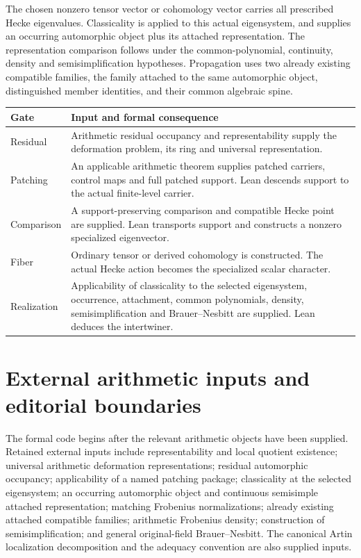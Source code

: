 \documentclass[11pt]{article}
\begin{document}
The chosen nonzero tensor vector or cohomology vector carries all prescribed Hecke eigenvalues. Classicality is applied to this actual eigensystem, and supplies an occurring automorphic object plus its attached representation. The representation comparison follows under the common-polynomial, continuity, density and semisimplification hypotheses. Propagation uses two already existing compatible families, the family attached to the same automorphic object, distinguished member identities, and their common algebraic spine.

\begin{longtable}{p{}p{}}
\toprule Gate & Input and formal consequence\\\midrule\endhead
Residual & Arithmetic residual occupancy and representability supply the deformation problem, its ring and universal representation.\\
Patching & An applicable arithmetic theorem supplies patched carriers, control maps and full patched support. Lean descends support to the actual finite-level carrier.\\
Comparison & A support-preserving comparison and compatible Hecke point are supplied. Lean transports support and constructs a nonzero specialized eigenvector.\\
Fiber & Ordinary tensor or derived cohomology is constructed. The actual Hecke action becomes the specialized scalar character.\\
Realization & Applicability of classicality to the selected eigensystem, occurrence, attachment, common polynomials, density, semisimplification and Brauer--Nesbitt are supplied. Lean deduces the intertwiner.\\
\bottomrule
\end{longtable}

\section{External arithmetic inputs and editorial boundaries}
The formal code begins after the relevant arithmetic objects have been supplied. Retained external inputs include representability and local quotient existence; universal arithmetic deformation representations; residual automorphic occupancy; applicability of a named patching package; classicality at the selected eigensystem; an occurring automorphic object and continuous semisimple attached representation; matching Frobenius normalizations; already existing attached compatible families; arithmetic Frobenius density; construction of semisimplification; and general original-field Brauer--Nesbitt. The canonical Artin localization decomposition and the adequacy convention are also supplied inputs.
\end{document}

